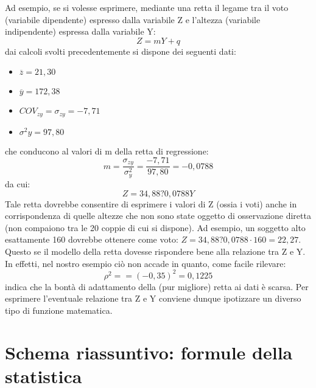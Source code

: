 \begin{esempio}
 Ad esempio, se si volesse esprimere, mediante una retta il legame tra il 
voto (variabile dipendente) espresso dalla variabile Z  e l'altezza 
(variabile indipendente) espressa dalla variabile Y:
 $$Z=mY+q$$
 dai calcoli svolti precedentemente si dispone dei seguenti dati:
 \begin{itemize} [nosep]
        \item $\overline{z}=21,30$
                \item $\overline{y}=172,38$
                \item $COV_{zy}=\sigma_{zy}=-7,71$
                \item $\sigma^2{y}=97,80$
 \end{itemize}
 che conducono al valori di m della retta di regressione:
 $$m=\frac{\sigma_{zy}}{\sigma^2_{y}}=\frac{-7,71}{97,80 }=-0,0788$$
 da cui:
 $$Z = 34,88 ? 0,0788 Y$$
 Tale retta dovrebbe consentire di esprimere i valori di Z (ossia i voti) 
anche in corrispondenza di quelle altezze che non sono state oggetto di 
osservazione diretta (non compaiono tra le 20 coppie di cui si dispone). Ad 
esempio, un soggetto alto esattamente 160 dovrebbe ottenere come voto: $Z 
=34,88 ? 0,0788 \cdot 160 = 22,27$. Questo se il modello della retta 
dovesse rispondere bene alla relazione tra Z e Y. In effetti, nel nostro 
esempio ciò non accade in quanto, come facile rilevare: 
 $$\rho^2== (-0,35)^2 = 0,1225$$
 indica che la bontà di adattamento della (pur migliore) retta ai dati è 
scarsa. Per esprimere l'eventuale relazione tra Z e Y conviene dunque 
ipotizzare un diverso tipo di funzione matematica.
\end{esempio}

\section{Schema riassuntivo: formule della statistica}
\label{sec:c_stat_formule}

